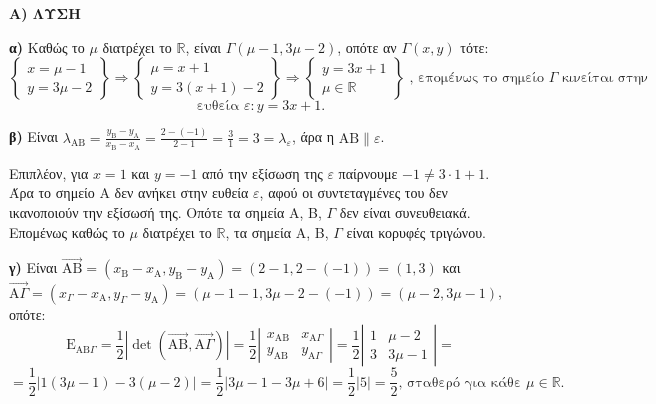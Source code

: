 {\bfseries Α) ΛΥΣΗ}

{\bfseries α)} Καθώς το $\mu$ διατρέχει το $\mathbb{R}$, είναι $\Gamma(\mu-1, 3\mu-2)$, οπότε αν $\Gamma(x,y)$ τότε:
\[ \left\{ \begin{array}{l} x = \mu - 1 \\ y = 3\mu - 2 \end{array} \right\} \Rightarrow \left\{ \begin{array}{l} \mu = x + 1 \\ y = 3(x + 1) - 2 \end{array} \right\} \Rightarrow \left\{ \begin{array}{l} y = 3x + 1 \\ \mu \in \mathbb{R} \end{array} \right\} \text{ , επομένως το σημείο } \Gamma \text{ κινείται στην} \]
\[ \text{ευθεία } \varepsilon: y = 3x + 1. \]

{\bfseries β)} Είναι $\lambda_{\mathrm{AB}} = \frac{y_{\mathrm{B}} - y_{\mathrm{A}}}{x_{\mathrm{B}} - x_{\mathrm{A}}} = \frac{2 - (-1)}{2 - 1} = \frac{3}{1} = 3 = \lambda_{\varepsilon}$, άρα η $\mathrm{AB} \parallel \varepsilon$.

Επιπλέον, για $x = 1$ και $y = -1$ από την εξίσωση της $\varepsilon$ παίρνουμε $-1 \neq 3 \cdot 1 + 1$.
Άρα το σημείο Α δεν ανήκει στην ευθεία $\varepsilon$, αφού οι συντεταγμένες του δεν ικανοποιούν την εξίσωσή της. Οπότε τα σημεία Α, Β, $\Gamma$ δεν είναι συνευθειακά. Επομένως καθώς το $\mu$ διατρέχει το $\mathbb{R}$, τα σημεία Α, Β, $\Gamma$ είναι κορυφές τριγώνου.

{\bfseries γ)} Είναι $\vec{\mathrm{AB}} = (x_{\mathrm{B}} - x_{\mathrm{A}}, y_{\mathrm{B}} - y_{\mathrm{A}}) = (2 - 1, 2 - (-1)) = (1, 3)$ και
$\vec{\mathrm{A}\Gamma} = (x_{\Gamma} - x_{\mathrm{A}}, y_{\Gamma} - y_{\mathrm{A}}) = (\mu - 1 - 1, 3\mu - 2 - (-1)) = (\mu - 2, 3\mu - 1)$, οπότε:
\[ \mathrm{E}_{\mathrm{AB}\Gamma} = \frac{1}{2} \left| \det(\vec{\mathrm{AB}}, \vec{\mathrm{A}\Gamma}) \right| = \frac{1}{2} \left| \begin{array}{cc} x_{\mathrm{AB}} & x_{\mathrm{A}\Gamma} \\ y_{\mathrm{AB}} & y_{\mathrm{A}\Gamma} \end{array} \right| = \frac{1}{2} \left| \begin{array}{cc} 1 & \mu - 2 \\ 3 & 3\mu - 1 \end{array} \right| = \]
\[ = \frac{1}{2} \left| 1(3\mu - 1) - 3(\mu - 2) \right| = \frac{1}{2} \left| 3\mu - 1 - 3\mu + 6 \right| = \frac{1}{2} \left| 5 \right| = \frac{5}{2} \text{, σταθερό για κάθε } \mu \in \mathbb{R}. \]

